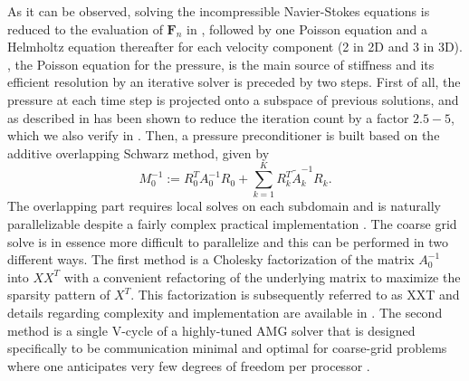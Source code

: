 \documentclass{sig-alternate}
\begin{document}
As it can be observed, solving the incompressible Navier-Stokes equations is reduced 
to the evaluation of $\mathbf{F}_n$ in , followed by one Poisson 
equation and a Helmholtz equation thereafter for each velocity component (2 in 2D and 3 in 3D). 
, the Poisson equation for the pressure, is the main 
source of stiffness and its efficient resolution by an iterative solver is preceded 
by two steps. First of all, the pressure at each time step is projected onto a 
subspace of previous solutions, and as described in \cite{Fischer1998} has been shown 
to reduce the iteration count by a factor $2.5-5$, which we also verify in .
Then, a pressure preconditioner is built based on the additive overlapping Schwarz 
method, given by 
\begin{equation}
 M_0^{-1} := R_0^T A_{0}^{-1} R_0 + \sum_{k=1}^{K} R_k^T \tilde{A}_k^{-1} R_k.
\end{equation}
The overlapping part requires local solves on each subdomain and is naturally parallelizable 
despite a fairly complex practical implementation \cite{Fischer199784,Fischer2005}. 
The coarse grid solve is in essence more difficult to parallelize and this can be 
performed in two different ways. The first 
method is a Cholesky factorization of the matrix $A_0^{-1}$ into $XX^T$ with a 
convenient refactoring of the underlying matrix to maximize the sparsity pattern 
of $X^T$. This factorization is subsequently referred to as XXT and details 
regarding complexity and implementation are available in \cite{Tufo2001151}. The 
second method is a single V-cycle of a highly-tuned
AMG solver that is designed specifically to be communication minimal
and optimal for coarse-grid problems where one anticipates very
few degrees of freedom per processor \cite{LottesAMG}. %
\end{document}
